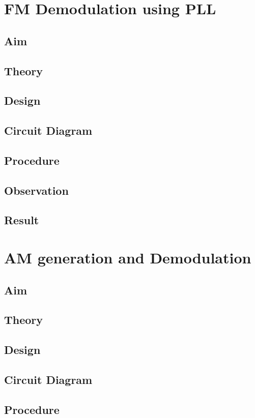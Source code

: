 \documentclass{book}
\begin{document}
\chapter[FM Demodulation using PLL]{FM Demodulation using PLL}
\section*{Aim}
\section*{Theory}
\section*{Design}
\section*{Circuit Diagram}
\section*{Procedure}
\section*{Observation}
\section*{Result}

\chapter[AM generation and Demodulation]{AM generation and Demodulation}
\section*{Aim}
\section*{Theory}
\section*{Design}
\section*{Circuit Diagram}
\section*{Procedure}
\end{document}
